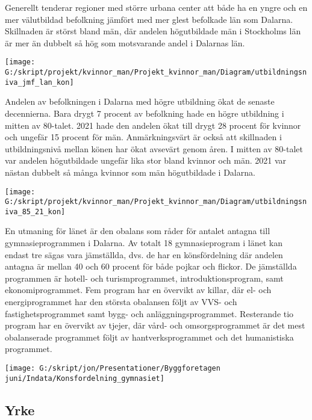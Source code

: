 \documentclass[
]{article}
\begin{document}
Generellt tenderar regioner med större urbana center att både ha en
yngre och en mer välutbildad befolkning jämfört med mer glest befolkade
län som Dalarna. Skillnaden är störst bland män, där andelen
högutbildade män i Stockholms län är mer än dubbelt så hög som
motsvarande andel i Dalarnas län.

\begin{center}\texttt{[image: G:/skript/projekt/kvinnor\_man/Projekt\_kvinnor\_man/Diagram/utbildningsniva\_jmf\_lan\_kon]} \end{center}

Andelen av befolkningen i Dalarna med högre utbildning ökat de senaste
decennierna. Bara drygt 7 procent av befolkning hade en högre utbildning
i mitten av 80-talet. 2021 hade den andelen ökat till drygt 28 procent
för kvinnor och ungefär 15 procent för män. Anmärkningsvärt är också att
skillnaden i utbildningsnivå mellan könen har ökat avsevärt genom åren.
I mitten av 80-talet var andelen högutbildade ungefär lika stor bland
kvinnor och män. 2021 var nästan dubbelt så många kvinnor som män
högutbildade i Dalarna.

\begin{center}\texttt{[image: G:/skript/projekt/kvinnor\_man/Projekt\_kvinnor\_man/Diagram/utbildningsniva\_85\_21\_kon]} \end{center}

En utmaning för länet är den obalans som råder för antalet antagna till
gymnasieprogrammen i Dalarna. Av totalt 18 gymnasieprogram i länet kan
endast tre sägas vara jämställda, dvs. de har en könsfördelning där
andelen antagna är mellan 40 och 60 procent för både pojkar och flickor.
De jämställda programmen är hotell- och turismprogrammet,
introduktionsprogram, samt ekonomiprogrammet. Fem program har en
övervikt av killar, där el- och energiprogrammet har den största
obalansen följt av VVS- och fastighetsprogrammet samt bygg- och
anläggningsprogrammet. Resterande tio program har en övervikt av tjejer,
där vård- och omsorgsprogrammet är det mest obalanserade programmet
följt av hantverksprogrammet och det humanistiska programmet.

\begin{center}\texttt{[image: G:/skript/jon/Presentationer/Byggforetagen juni/Indata/Konsfordelning\_gymnasiet]} \end{center}

\hypertarget{yrke}{%
\subsection{Yrke}\label{yrke}}
\end{document}
